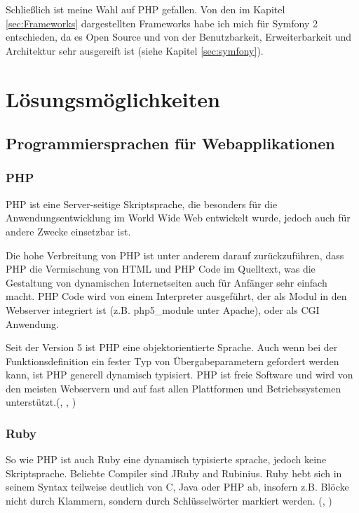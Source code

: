 \documentclass[12pt]{report}
\begin{document}
Schließlich ist meine Wahl auf PHP gefallen. Von den im Kapitel \ref{sec:Frameworks} dargestellten Frameworks habe ich mich für Symfony 2 entschieden, da es Open Source und von der Benutzbarkeit, Erweiterbarkeit und Architektur sehr ausgereift ist (siehe Kapitel \ref{sec:symfony}).




\chapter{Lösungsmöglichkeiten}

\section{Programmiersprachen für Webapplikationen}
\label{sec:Programmiersprachen}
\subsection{PHP}
PHP ist eine Server-seitige Skriptsprache, die besonders für die Anwendungsentwicklung im World Wide Web entwickelt wurde, jedoch auch für andere Zwecke einsetzbar ist.

Die hohe Verbreitung von PHP ist unter anderem darauf zurückzuführen, dass PHP die Vermischung von HTML und PHP Code im Quelltext, was die Gestaltung von dynamischen Internetseiten auch für Anfänger sehr einfach macht. PHP Code wird von einem Interpreter ausgeführt, der als Modul in den Webserver integriert ist (z.B. php5\_module unter Apache), oder als CGI Anwendung.

Seit der Version 5 ist PHP eine objektorientierte Sprache. Auch wenn bei der Funktionsdefinition ein fester Typ von Übergabeparametern gefordert werden kann, ist PHP generell dynamisch typisiert. PHP ist freie Software und wird von den meisten Webservern und auf fast allen Plattformen und Betriebssystemen unterstützt.(\cite{ebooks:PHP}, \cite{ebooks:PHP2}, \cite{PHPManual})

\subsection{Ruby}
So wie PHP ist auch Ruby eine dynamisch typisierte sprache, jedoch keine Skriptsprache. Beliebte Compiler sind JRuby and Rubinius. Ruby hebt sich in seinem Syntax teilweise deutlich von C, Java oder PHP ab, insofern z.B. Blöcke nicht durch Klammern, sondern durch Schlüsselwörter markiert werden. (\cite{Ruby}, \cite{wiki:Ruby})
\end{document}
